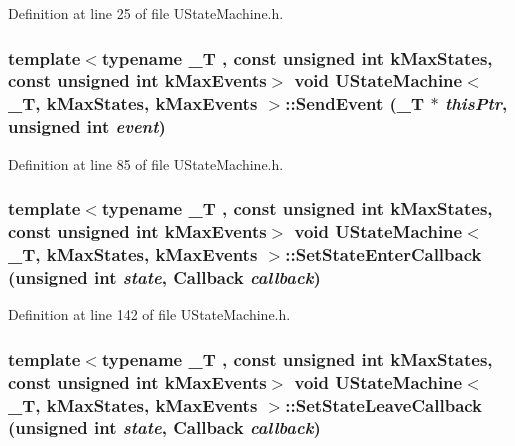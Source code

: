 Definition at line 25 of file UStateMachine.h.\hypertarget{class_u_state_machine_cbcab43339103431455ce82c9e059f90}{
\subsubsection[{SendEvent}]{\setlength{\rightskip}{0pt plus 5cm}template$<$typename \_\-T , const unsigned int kMaxStates, const unsigned int kMaxEvents$>$ void {\bf UStateMachine}$<$ \_\-T, kMaxStates, kMaxEvents $>$::SendEvent (\_\-T $\ast$ {\em thisPtr}, \/  unsigned int {\em event})}}
\label{class_u_state_machine_cbcab43339103431455ce82c9e059f90}




Definition at line 85 of file UStateMachine.h.\hypertarget{class_u_state_machine_a19a8b515f8343a99a6017c1dadf4d90}{
\subsubsection[{SetStateEnterCallback}]{\setlength{\rightskip}{0pt plus 5cm}template$<$typename \_\-T , const unsigned int kMaxStates, const unsigned int kMaxEvents$>$ void {\bf UStateMachine}$<$ \_\-T, kMaxStates, kMaxEvents $>$::SetStateEnterCallback (unsigned int {\em state}, \/  {\bf Callback} {\em callback})}}
\label{class_u_state_machine_a19a8b515f8343a99a6017c1dadf4d90}




Definition at line 142 of file UStateMachine.h.\hypertarget{class_u_state_machine_b96d528933ba715d5a75d5f42cd193e0}{
\subsubsection[{SetStateLeaveCallback}]{\setlength{\rightskip}{0pt plus 5cm}template$<$typename \_\-T , const unsigned int kMaxStates, const unsigned int kMaxEvents$>$ void {\bf UStateMachine}$<$ \_\-T, kMaxStates, kMaxEvents $>$::SetStateLeaveCallback (unsigned int {\em state}, \/  {\bf Callback} {\em callback})}}
\label{class_u_state_machine_b96d528933ba715d5a75d5f42cd193e0}




